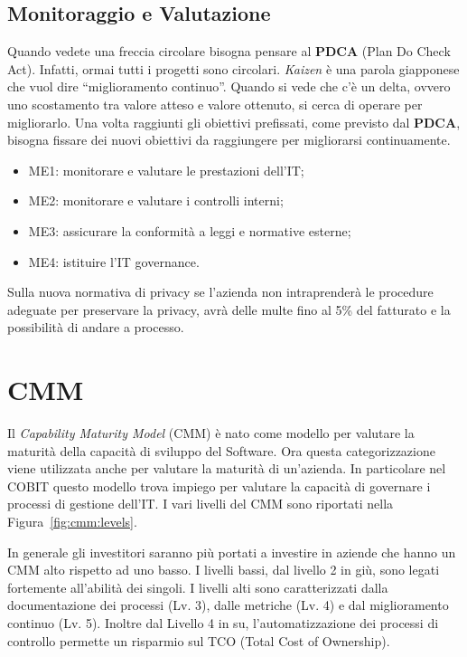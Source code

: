 \subsection{Monitoraggio e Valutazione}
Quando vedete una freccia circolare bisogna pensare al \textbf{PDCA} (Plan Do
Check Act). Infatti, ormai tutti i progetti sono circolari. \emph{Kaizen} è
una parola giapponese che vuol dire “miglioramento continuo”. Quando si vede
che c’è un delta, ovvero uno scostamento tra valore atteso e valore ottenuto,
si cerca di operare per migliorarlo. Una volta raggiunti gli obiettivi
prefissati, come previsto dal \textbf{PDCA}, bisogna fissare dei nuovi
obiettivi da raggiungere per migliorarsi continuamente.

\begin{itemize}
\item ME1: monitorare e valutare le prestazioni dell'IT;
\item ME2: monitorare e valutare i controlli interni;
\item ME3: assicurare la conformità a leggi e normative esterne;
\item ME4: istituire l'IT governance.
\end{itemize}

Sulla nuova normativa di privacy se l'azienda non intraprenderà le procedure
adeguate per preservare la privacy, avrà delle multe fino al 5\% del fatturato
e la possibilità di andare a processo.






\section{CMM}

Il \textit{Capability Maturity Model} (CMM) è nato come modello per
valutare la maturità della capacità
di sviluppo del Software. Ora questa categorizzazione viene utilizzata
anche per valutare la maturità di un'azienda.
In particolare nel COBIT questo modello trova impiego per valutare la
capacità di governare i processi di gestione dell'IT.
I vari livelli del CMM sono riportati nella Figura~\ref{fig:cmm:levels}.

In generale gli investitori saranno più portati a investire in aziende che
hanno un CMM alto rispetto ad uno basso.
I livelli bassi, dal livello 2 in giù, sono legati fortemente all'abilità
dei singoli.
I livelli alti sono caratterizzati
dalla documentazione dei processi (Lv. 3),
dalle metriche (Lv. 4) e dal miglioramento continuo (Lv. 5).
Inoltre dal Livello 4 in su,
l'automatizzazione dei processi di controllo permette un risparmio sul
TCO (Total Cost of Ownership).





